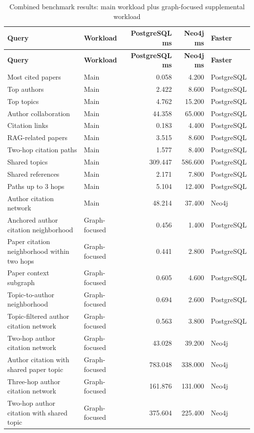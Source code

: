 \documentclass[11pt]{article}
\begin{document}
\scriptsize
\begin{longtable}{|p{}|p{}|r|r|p{}|}
\caption{Combined benchmark results: main workload plus graph-focused supplemental workload}\\
\hline
\textbf{Query} & \textbf{Workload} & \textbf{PostgreSQL ms} & \textbf{Neo4j ms} & \textbf{Faster} \\
\hline
\endfirsthead
\hline
\textbf{Query} & \textbf{Workload} & \textbf{PostgreSQL ms} & \textbf{Neo4j ms} & \textbf{Faster} \\
\hline
\endhead
Most cited papers & Main & 0.058 & 4.200 & PostgreSQL \\
\hline
Top authors & Main & 2.422 & 8.600 & PostgreSQL \\
\hline
Top topics & Main & 4.762 & 15.200 & PostgreSQL \\
\hline
Author collaboration & Main & 44.358 & 65.000 & PostgreSQL \\
\hline
Citation links & Main & 0.183 & 4.400 & PostgreSQL \\
\hline
RAG-related papers & Main & 3.515 & 8.600 & PostgreSQL \\
\hline
Two-hop citation paths & Main & 1.577 & 8.400 & PostgreSQL \\
\hline
Shared topics & Main & 309.447 & 586.600 & PostgreSQL \\
\hline
Shared references & Main & 2.171 & 7.800 & PostgreSQL \\
\hline
Paths up to 3 hops & Main & 5.104 & 12.400 & PostgreSQL \\
\hline
Author citation network & Main & 48.214 & 37.400 & Neo4j \\
\hline
Anchored author citation neighborhood & Graph-focused & 0.456 & 1.400 & PostgreSQL \\
\hline
Paper citation neighborhood within two hops & Graph-focused & 0.441 & 2.800 & PostgreSQL \\
\hline
Paper context subgraph & Graph-focused & 0.605 & 4.600 & PostgreSQL \\
\hline
Topic-to-author neighborhood & Graph-focused & 0.694 & 2.600 & PostgreSQL \\
\hline
Topic-filtered author citation network & Graph-focused & 0.563 & 3.800 & PostgreSQL \\
\hline
Two-hop author citation network & Graph-focused & 43.028 & 39.200 & Neo4j \\
\hline
Author citation with shared paper topic & Graph-focused & 783.048 & 338.000 & Neo4j \\
\hline
Three-hop author citation network & Graph-focused & 161.876 & 131.000 & Neo4j \\
\hline
Two-hop author citation with shared topic & Graph-focused & 375.604 & 225.400 & Neo4j \\
\hline
\end{longtable}
\normalsize
\end{document}
